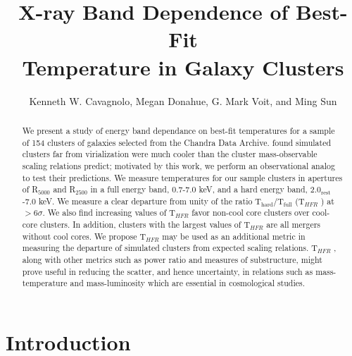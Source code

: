 \documentclass{emulateapj}
\newcommand{\tf}{T$_{HFR}$ }
\begin{document}
\title{X-ray Band Dependence of Best-Fit \\
	Temperature in Galaxy Clusters}
\author{Kenneth W. Cavagnolo, Megan
Donahue, G. Mark Voit, and Ming
Sun}


\begin{abstract}
We present a study of energy band dependance on best-fit temperatures
for a sample of 154 clusters of galaxies selected from the Chandra
Data Archive. \cite{2001ApJ...546..100M} found simulated clusters far from
virialization were much cooler than the cluster mass-observable
scaling relations predict; motivated by this work, we perform an
observational analog to test their predictions. We measure
temperatures for our sample clusters in apertures of R$_{5000}$ and
R$_{2500}$ in a full energy band, 0.7-7.0 keV, and a hard energy band,
2.0$_{\text{rest}}$-7.0 keV. We measure a clear departure from unity of the
ratio T$_{\text{hard}}$/T$_{\text{full}}$ (\tf) at $> 6\sigma$. We also find
increasing values of \tf favor non-cool core clusters over cool-core
clusters. In addition, clusters with the largest values of \tf are all
mergers without cool cores. We propose \tf may be used as an additional metric in
measuring the departure of simulated clusters from expected scaling
relations. \tf, along with other metrics such as power ratio and
measures of substructure, might prove useful in reducing the scatter,
and hence uncertainty, in relations such as mass-temperature and
mass-luminosity which are essential in cosmological studies.
\end{abstract}



\section{Introduction}\label{sec:intro}
\end{document}
